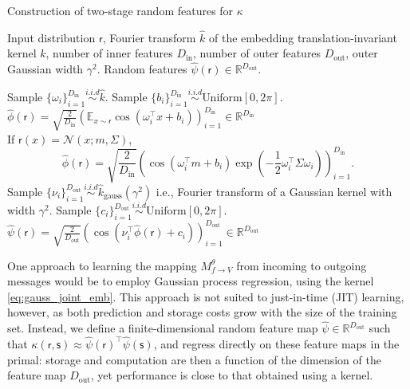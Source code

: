 \documentclass[english]{article}
\theoremstyle{plain}
\theoremstyle{plain}
\newcommand{\factor}{f}				%
\newcommand{\outV}{V}                         %
\newcommand{\approxMsg}[3]{M_{#1 \rightarrow #2}^{#3}}			%
\begin{document}
\begin{algorithm}[t]
\caption{Construction of two-stage random features for $\kappa$}
\label{algo:random_features_kgg}
\begin{algorithmic}[1]
\REQUIRE Input distribution $\mathsf{r}$, Fourier transform $\hat{k}$ of 
the embedding translation-invariant kernel $k$, number of inner features $D_\mathrm{in}$, number of outer features $D_\mathrm{out}$, outer Gaussian width $\gamma^2$.
\ENSURE Random features $\hat{\psi}(\mathsf{r}) \in \mathbb{R}^{D_\mathrm{out}}$. 

\STATE Sample  $\{ \omega_i \}_{i=1}^{D_\mathrm{in}} \overset{i.i.d}{\sim} \hat{k}$.
\STATE Sample $\{b_i\}_{i=1}^{D_\mathrm{in}} \overset{i.i.d}{\sim} \text{Uniform}[0, 2\pi] $.
\STATE $\hat{\phi}(\mathsf{r}) = \sqrt{\frac{2}{D_\mathrm{in}}} \left( \mathbb{E}_{x \sim \mathsf{r}} 
\cos(\omega_{i}^{\top}x+b_{i} ) \right)_{i=1}^{D_\mathrm{in}} \in \mathbb{R}^{D_\mathrm{in}}$ \\
If $\mathsf{r}(x)=\mathcal{N}(x;m, \Sigma )$, 
\small
\begin{equation*}
\hat{\phi}( \mathsf{r}) = \sqrt{\frac{2}{D_\mathrm{in}}} \left( \cos(\omega_{i}^{\top}m +b_{i}) \exp 
\left(-\frac{1}{2}\omega_{i}^{\top}\Sigma \omega_{i} \right) \right)_{i=1}^{D_\mathrm{in}}.
\end{equation*}
%
\STATE Sample $\{ \nu_i \}_{i=1}^{D_\mathrm{out}} \overset{i.i.d}{\sim} \hat{k}_{\text{gauss}}(\gamma^{2})$
i.e., Fourier transform of a Gaussian kernel with width $\gamma^2$.
\STATE Sample $\{c_i\}_{i=1}^{D_\mathrm{out}} \overset{i.i.d}{\sim} \text{Uniform}[0, 2\pi] $.
\STATE $\hat{\psi}(\mathsf{r}) = \sqrt{\frac{2}{D_\mathrm{out}}} \left(  
\cos(\nu_{i}^{\top} \hat{\phi}(\mathsf{r}) + c_{i} ) \right)_{i=1}^{D_\mathrm{out}} \in 
\mathbb{R}^{D_\mathrm{out}}$
\end{algorithmic}
\end{algorithm}

One approach to learning the mapping  $\approxMsg{\factor}{\outV}{\theta}$ from incoming to outgoing messages
would be to employ Gaussian process regression, using the kernel \eqref{eq:gauss_joint_emb}.
This approach is not suited to just-in-time (JIT) learning, however,
as both prediction and storage costs grow with the size of the training set.
Instead, we define 
a finite-dimensional random feature map $\hat{\psi} \in \mathbb{R}^{D_\mathrm{out}}$ such that 
$\kappa(\mathsf{r}, \mathsf{s}) \approx \hat{\psi}(\mathsf{r})^\top \hat{\psi}(\mathsf{s})$, 
and regress directly on these feature maps in the primal: storage and computation 
are then a function of the dimension of the feature map $D_\mathrm{out}$, yet performance is close to that
obtained using a kernel.
\end{document}
